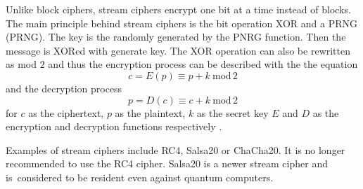 Unlike block ciphers, stream ciphers encrypt one bit at a time instead of blocks. The main principle behind stream ciphers is the bit operation XOR and a PRNG (\acl{PRNG}). The key is the randomly generated by the PNRG function. Then the message is XORed with generate key. The XOR operation can also be rewritten as mod $2$ and thus the encryption process can be described with the the equation
\begin{equation}
  c = E(p)\equiv p + k\ \mathrm{mod}\,2
\end{equation}
\noindent and the decryption process
\begin{equation}
  p = D(c)\equiv c + k\ \mathrm{mod}\,2
\end{equation}
\noindent for $c$ as the ciphertext, $p$ as the plaintext, $k$ as the secret key $E$ and $D$ as the encryption and decryption functions respectively \cite{Paar2010}.

Examples of stream ciphers include RC4, Salsa20 or ChaCha20. It is no longer recommended to use the RC4 cipher. Salsa20 is a newer stream cipher and is~considered to be resident even against quantum computers. \cite{Bernstein149}\cite{Ristic2014}

